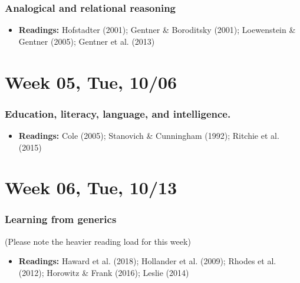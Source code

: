 \documentclass[11pt,man]{article}
\providecommand{\tightlist}{%
  \setlength{\itemsep}{0pt}\setlength{\parskip}{0pt}}
\begin{document}
\hypertarget{analogical-and-relational-reasoning}{%
\subsubsection{Analogical and relational
reasoning}\label{analogical-and-relational-reasoning}}

\begin{itemize}
\tightlist
\item
  \textbf{Readings:} Hofstadter (2001); Gentner \& Boroditsky (2001);
  Loewenstein \& Gentner (2005); Gentner et al. (2013)
\end{itemize}

\hypertarget{week-05-tue-1006}{%
\section{Week 05, Tue, 10/06}\label{week-05-tue-1006}}

\hypertarget{education-literacy-language-and-intelligence.}{%
\subsubsection{Education, literacy, language, and
intelligence.}\label{education-literacy-language-and-intelligence.}}

\begin{itemize}
\tightlist
\item
  \textbf{Readings:} Cole (2005); Stanovich \& Cunningham (1992);
  Ritchie et al. (2015)
\end{itemize}

\hypertarget{week-06-tue-1013}{%
\section{Week 06, Tue, 10/13}\label{week-06-tue-1013}}

\hypertarget{learning-from-generics}{%
\subsubsection{Learning from generics}\label{learning-from-generics}}

(Please note the heavier reading load for this week)

\begin{itemize}
\tightlist
\item
  \textbf{Readings:} Haward et al. (2018); Hollander et al. (2009);
  Rhodes et al. (2012); Horowitz \& Frank (2016); Leslie (2014)
\end{itemize}
\end{document}
